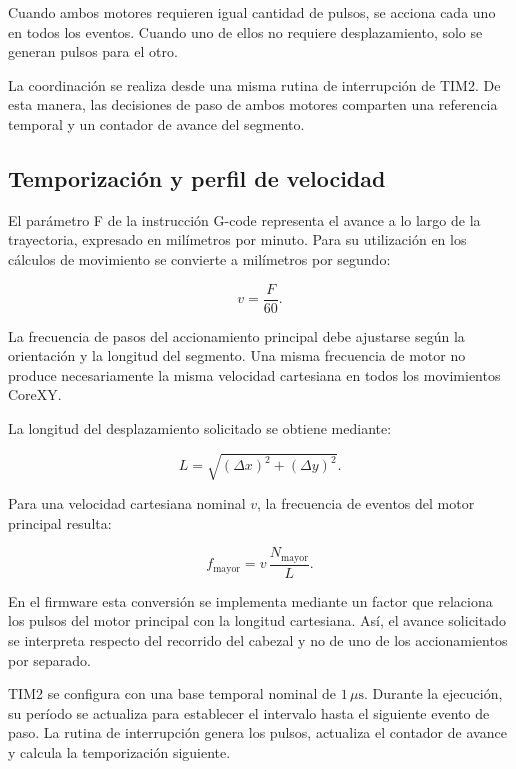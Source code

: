 \documentclass[blue,fullpaper]{ludusofficial}  %
\begin{document}
Cuando ambos motores requieren igual cantidad
de pulsos, se acciona cada uno en todos los eventos.
Cuando uno de ellos no requiere desplazamiento,
solo se generan pulsos para el otro.

La coordinación se realiza desde una misma rutina
de interrupción de TIM2. De esta manera,
las decisiones de paso de ambos motores comparten
una referencia temporal y un contador de avance
del segmento.

\subsection{Temporización y perfil de velocidad}

El parámetro F de la instrucción G-code representa
el avance a lo largo de la trayectoria, expresado
en milímetros por minuto. Para su utilización
en los cálculos de movimiento se convierte
a milímetros por segundo:

\begin{equation}
    v = \frac{F}{60}.
\end{equation}

La frecuencia de pasos del accionamiento principal
debe ajustarse según la orientación y la longitud
del segmento. Una misma frecuencia de motor no
produce necesariamente la misma velocidad cartesiana
en todos los movimientos CoreXY.

La longitud del desplazamiento solicitado se obtiene
mediante:

\begin{equation}
    L = \sqrt{(\Delta x)^2 + (\Delta y)^2}.
\end{equation}

Para una velocidad cartesiana nominal $v$, la
frecuencia de eventos del motor principal resulta:

\begin{equation}
    f_{\mathrm{mayor}} =
    v\,\frac{N_{\mathrm{mayor}}}{L}.
    \label{eq:frecuencia-corexy}
\end{equation}

En el firmware esta conversión se implementa
mediante un factor que relaciona los pulsos
del motor principal con la longitud cartesiana.
Así, el avance solicitado se interpreta respecto
del recorrido del cabezal y no de uno de los
accionamientos por separado.

TIM2 se configura con una base temporal nominal
de $1\,\mu\mathrm{s}$. Durante la ejecución,
su período se actualiza para establecer
el intervalo hasta el siguiente evento de paso.
La rutina de interrupción genera los pulsos,
actualiza el contador de avance y calcula
la temporización siguiente.
\end{document}
